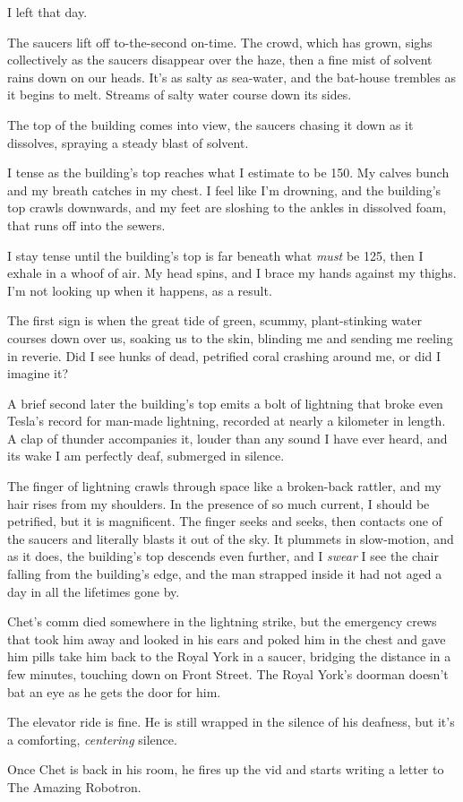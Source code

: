 I left that day.

\tb

The saucers lift off to-the-second on-time. The crowd, which has
grown, sighs collectively as the saucers disappear over the haze,
then a fine mist of solvent rains down on our heads. It's as salty
as sea-water, and the bat-house trembles as it begins to melt.
Streams of salty water course down its sides.

The top of the building comes into view, the saucers chasing it
down as it dissolves, spraying a steady blast of solvent.

I tense as the building's top reaches what I estimate to be 150. My
calves bunch and my breath catches in my chest. I feel like I'm
drowning, and the building's top crawls downwards, and my feet are
sloshing to the ankles in dissolved foam, that runs off into the
sewers.

I stay tense until the building's top is far beneath what
\emph{must} be 125, then I exhale in a whoof of air. My head spins,
and I brace my hands against my thighs. I'm not looking up when it
happens, as a result.

The first sign is when the great tide of green, scummy,
plant-stinking water courses down over us, soaking us to the skin,
blinding me and sending me reeling in reverie. Did I see hunks of
dead, petrified coral crashing around me, or did I imagine it?

A brief second later the building's top emits a bolt of lightning
that broke even Tesla's record for man-made lightning, recorded at
nearly a kilometer in length. A clap of thunder accompanies it,
louder than any sound I have ever heard, and  its wake I am
perfectly deaf, submerged in silence.

The finger of lightning crawls through space like a broken-back
rattler, and my hair rises from my shoulders. In the presence of so
much current, I should be petrified, but it is magnificent. The
finger seeks and seeks, then contacts one of the saucers and
literally blasts it out of the sky. It plummets in slow-motion, and
as it does, the building's top descends even further, and I
\emph{swear} I see the chair falling from the building's edge, and
the man strapped inside it had not aged a day in all the lifetimes
gone by.

\tb

Chet's comm died somewhere in the lightning strike, but the
emergency crews that took him away and looked in his ears and poked
him in the chest and gave him pills take him back to the Royal York
in a saucer, bridging the distance in a few minutes, touching down
on Front Street. The Royal York's doorman doesn't bat an eye as he
gets the door for him.

The elevator ride is fine. He is still wrapped in the silence of
his deafness, but it's a comforting, \emph{centering} silence.

Once Chet is back in his room, he fires up the vid and starts
writing a letter to The Amazing Robotron.


